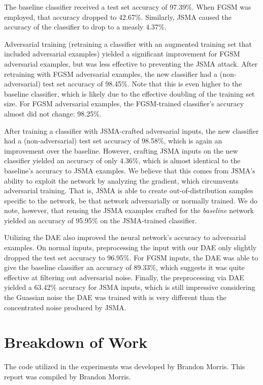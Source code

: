 \documentclass{article}
\begin{document}
The baseline classifier received a test set accuracy of 97.39\%. When FGSM was
employed, that accuracy dropped to 42.67\%. Similarly, JSMA caused the accuracy
of the classifier to drop to a measly 4.37\%.

Adversarial training (retraining a classifier with an augmented training set
that included adversarial examples) yielded a significant improvement for FGSM
adversarial examples, but was less effective to preventing the JSMA attack.
After retraining with FGSM adversarial examples, the new classifier had a
(non-adversarial) test set accuracy of 98.45\%. Note that this is even higher to
the baseline classifier, which is likely due to the effective doubling of the
training set size. For FGSM adversarial examples, the FGSM-trained classifier's
accuracy almost did not change: 98.25\%.

After training a classifier with JSMA-crafted adversarial inputs, the new
classifier had a (non-adversarial) test set accuracy of 98.58\%, which is again
an improvement over the baseline. However, crafting JSMA inputs on the new
classifier yielded an accuracy of only 4.36\%, which is almost identical to the
baseline's accuracy to JSMA examples. We believe that this comes from JSMA's
ability to exploit the network by analyzing the gradient, which circumvents
adversarial training. That is, JSMA is able to create out-of-distribution
samples specific to the network, be that network adversarially or normally
trained. We do note, however, that reusing the JSMA examples crafted for the
\textit{baseline} network yielded an accuracy of 95.95\% on the JSMA-trained
classifier.

Utilizing the DAE also improved the neural network's accuracy to adversarial
examples. On normal inputs, preprocessing the input with our DAE only slightly
dropped the test set accuracy to 96.95\%. For FGSM inputs, the DAE was able to
give the baseline classifier an accuracy of 89.33\%, which suggests it was quite
effective at filtering out adversarial noise. Finally, the preprocessing via DAE
yielded a 63.42\% accuracy for JSMA inputs, which is still impressive
considering the Guassian noise the DAE was trained with is very different than
the concentrated noise produced by JSMA.


\section{Breakdown of Work}

The code utilized in the experiments was developed by Brandon Morris. This
report was compiled by Brandon Morris.

%


\end{document}
